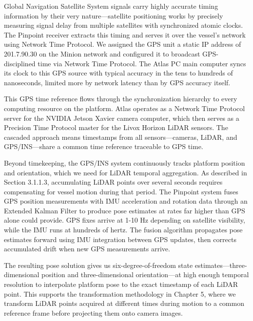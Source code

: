 \documentclass{erauthesis}
\begin{document}
Global Navigation Satellite System signals carry highly accurate timing information by their very nature—satellite positioning works by precisely measuring signal delay from multiple satellites with synchronized atomic clocks.
The Pinpoint receiver extracts this timing and serves it over the vessel's network using Network Time Protocol.
We assigned the \ac{GPS} unit a static IP address of 201.7.90.30 on the Minion network and configured it to broadcast \ac{GPS}-disciplined time via Network Time Protocol.
The Atlas PC main computer syncs its clock to this \ac{GPS} source with typical accuracy in the tens to hundreds of nanoseconds, limited more by network latency than by \ac{GPS} accuracy itself.

This \ac{GPS} time reference flows through the synchronization hierarchy to every computing resource on the platform.
Atlas operates as a Network Time Protocol server for the NVIDIA Jetson Xavier camera computer, which then serves as a Precision Time Protocol master for the Livox Horizon \ac{LiDAR} sensors.
The cascaded approach means timestamps from all sensors—cameras, \ac{LiDAR}, and \ac{GPS}/\ac{INS}—share a common time reference traceable to \ac{GPS} time.

Beyond timekeeping, the \ac{GPS}/\ac{INS} system continuously tracks platform position and orientation, which we need for \ac{LiDAR} temporal aggregation.
As described in Section 3.1.1.3, accumulating \ac{LiDAR} points over several seconds requires compensating for vessel motion during that period.
The Pinpoint system fuses \ac{GPS} position measurements with \ac{IMU} acceleration and rotation data through an Extended Kalman Filter to produce pose estimates at rates far higher than \ac{GPS} alone could provide.
\ac{GPS} fixes arrive at 1-10 Hz depending on satellite visibility, while the \ac{IMU} runs at hundreds of hertz.
The fusion algorithm propagates pose estimates forward using \ac{IMU} integration between \ac{GPS} updates, then corrects accumulated drift when new \ac{GPS} measurements arrive.

The resulting pose solution gives us six-degree-of-freedom state estimates—three-dimensional position and three-dimensional orientation—at high enough temporal resolution to interpolate platform pose to the exact timestamp of each \ac{LiDAR} point.
This supports the transformation methodology in Chapter 5, where we transform \ac{LiDAR} points acquired at different times during motion to a common reference frame before projecting them onto camera images.
\end{document}
